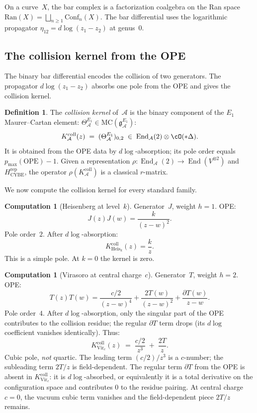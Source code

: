 \documentclass[11pt,reqno]{amsart}
\theoremstyle{definition}
\newtheorem{definition}[theorem]{Definition}
\newtheorem{computation}[theorem]{Computation}
\theoremstyle{remark}
\newcommand{\cA}{\mathcal{A}}
\newcommand{\gEone}{\mathfrak{g}^{E_1}_\cA}
\newcommand{\Eone}{E_1}
\newcommand{\Ran}{\mathrm{Ran}}
\newcommand{\MC}{\mathrm{MC}}
\newcommand{\Conf}{\mathrm{Conf}}
\newcommand{\Vir}{\mathrm{Vir}}
\newcommand{\Heis}{\mathrm{Heis}}
\numberwithin{equation}{section}
\begin{document}
On a curve~$X$, the bar complex is a factorization coalgebra
on the Ran space $\Ran(X) = \bigsqcup_{n \ge 1}\Conf_n(X)$.
The bar differential uses the logarithmic propagator
$\eta_{12} = d\log(z_1 - z_2)$ at genus~$0$.

\subsection{The collision kernel from the OPE}

The binary bar differential encodes the collision of two generators.
The propagator $d\log(z_1-z_2)$ absorbs one pole from the OPE and gives
the collision kernel.

\begin{definition}\label{def:r-matrix}
The \emph{collision kernel} of~$\cA$ is the binary component
of the $\Eone$ Maurer--Cartan element:
$\Theta^{\Eone}_\cA \in \MC(\gEone)$:
\[
K_\cA^{\mathrm{coll}}(z)
\;=\; (\Theta^{\Eone}_\cA)_{0,2}
\;\in\; \operatorname{End}_\cA(2)\otimes\cO(*\Delta).
\]
It is obtained from the OPE data by $d\log$-absorption; its pole order
equals $p_{\max}(\mathrm{OPE})-1$.  Given a representation
$\rho\colon\operatorname{End}_\cA(2)\to\operatorname{End}(V^{\otimes2})$
and $H_{\mathrm{CYBE}}^{\mathrm{rep}}$, the operator
$\rho(K_\cA^{\mathrm{coll}})$ is a classical $r$-matrix.
\end{definition}

We now compute the collision kernel for every standard family.

\begin{computation}[Heisenberg at level~$k$]
\label{comp:r-heis}
Generator~$J$, weight $h = 1$. OPE:
\[
J(z)J(w) = \frac{k}{(z-w)^2}.
\]
Pole order~$2$. After $d\log$-absorption:
\begin{equation}\label{eq:r-heis}
\boxed{\;K_{\Heis_k}^{\mathrm{coll}}(z) = \frac{k}{z}.\;}
\end{equation}
This is a simple pole.  At $k=0$ the kernel is zero.
\end{computation}

\begin{computation}[Virasoro at central charge~$c$]
\label{comp:r-vir}
Generator~$T$, weight $h = 2$. OPE:
\[
T(z)T(w) = \frac{c/2}{(z-w)^4}
+ \frac{2T(w)}{(z-w)^2} + \frac{\partial T(w)}{z-w}.
\]
Pole order~$4$. After $d\log$-absorption, only the singular
part of the OPE contributes to the collision residue; the
regular $\partial T$ term drops (its $d\log$ coefficient
vanishes identically). Thus:
\begin{equation}\label{eq:r-vir}
\boxed{\;K_{\Vir_c}^{\mathrm{coll}}(z)
\;=\; \frac{c/2}{z^3} \;+\; \frac{2T}{z}.\;}
\end{equation}
Cubic pole, \emph{not} quartic. The leading term
$(c/2)/z^3$ is a $c$-number; the subleading term
$2T/z$ is field-dependent. The regular term $\partial T$
from the OPE is absent in $K_{\Vir_c}^{\mathrm{coll}}$: it is $d\log$-absorbed,
or equivalently it is a total derivative on the configuration
space and contributes $0$ to the residue pairing.
At central charge $c=0$, the vacuum cubic term vanishes and the
field-dependent piece $2T/z$ remains.
\end{computation}
\end{document}
